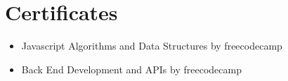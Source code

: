 \documentclass[a4paper]{article}
\begin{document}
\section{Certificates}
\begin{itemize}
	\item Javascript Algorithms and Data Structures by freecodecamp
	\item Back End Development and APIs by freecodecamp
\end{itemize}
\end{document}
